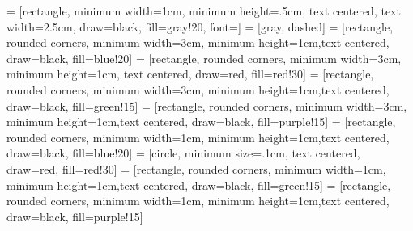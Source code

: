 \theoremstyle{definition}
\newtheorem{thm}{Theorem}[chapter]
\newtheorem{defn}[thm]{Definition}
\newtheorem{lem}[thm]{Lemma}
\newtheorem{cor}[thm]{Corollary}
\newtheorem{conj}[thm]{Conjecture}
\newtheorem{prop}[thm]{Proposition}
\newtheorem{alg}[thm]{Algorithm}




\usetikzlibrary{cd}
\usetikzlibrary{matrix}
\usetikzlibrary{shapes.geometric}
\usetikzlibrary{arrows}

 = [rectangle, minimum width=1cm, minimum height=.5cm, text
centered, text width=2.5cm, draw=black, fill=gray!20, font=\footnotesize]
 = [gray, dashed]
 = [rectangle, rounded corners, minimum width=3cm, minimum
height=1cm,text centered, draw=black, fill=blue!20]
 = [rectangle, rounded corners, minimum width=3cm, minimum height=1cm, text
centered, draw=red, fill=red!30]
 = [rectangle, rounded corners, minimum width=3cm, minimum
height=1cm,text centered, draw=black, fill=green!15]
 = [rectangle, rounded corners, minimum width=3cm, minimum
height=1cm,text centered, draw=black, fill=purple!15]
 = [rectangle, rounded corners, minimum width=1cm, minimum
height=1cm,text centered, draw=black, fill=blue!20]
 = [circle, minimum size=.1cm, text centered, draw=red, fill=red!30]
 = [rectangle, rounded corners, minimum width=1cm, minimum
height=1cm,text centered, draw=black, fill=green!15]
 = [rectangle, rounded corners, minimum width=1cm, minimum
height=1cm,text centered, draw=black, fill=purple!15]

